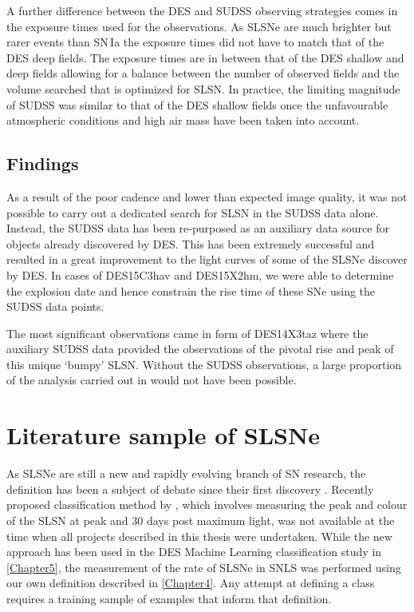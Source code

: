 A further difference between the DES and SUDSS observing strategies comes in the exposure times used for the observations. As SLSNe are much brighter but rarer events than SN\,Ia the exposure times did not have to match that of the DES deep fields. The exposure times are in between that of the DES shallow and deep fields allowing for a balance between the number of observed fields and the volume searched that is optimized for SLSN. In practice, the limiting magnitude of SUDSS was similar to that of the DES shallow fields once the unfavourable atmospheric conditions and high air mass have been taken into account.

\subsection{Findings}
As a result of the poor cadence and lower than expected image quality, it was not possible to carry out a dedicated search for SLSN in the SUDSS data alone. Instead, the SUDSS data has been re-purposed as an auxiliary data source for objects already discovered by DES. This has been extremely successful and resulted in a great improvement to the light curves of some of the SLSNe discover by DES. In cases of DES15C3hav and DES15X2hm, we were able to determine the explosion date and hence constrain the rise time of these SNe using the SUDSS data points.

The most significant observations came in form of DES14X3taz where the auxiliary SUDSS data provided the observations of the pivotal rise and peak of this unique `bumpy' SLSN. Without the SUDSS observations, a large proportion of the analysis carried out in \citep{Smith2016} would not have been possible.

\section{Literature sample of SLSNe} \label{sec:litSample}
As SLSNe are still a new and rapidly evolving branch of SN research, the definition has been a subject of debate since their first discovery \citep{Gal-Yam2012, Inserra2013, Nicholl2014}. Recently proposed classification method by \citet{Inserra2018}, which involves measuring the peak and colour of the SLSN at peak and 30 days post maximum light, was not available at the time when all projects described in this thesis were undertaken. While the new approach has been used in the DES Machine Learning classification study in \cref{Chapter5}, the measurement of the rate of SLSNe in SNLS was performed using our own definition described in \cref{Chapter4}. Any attempt at defining a class requires a training sample of examples that inform that definition.

